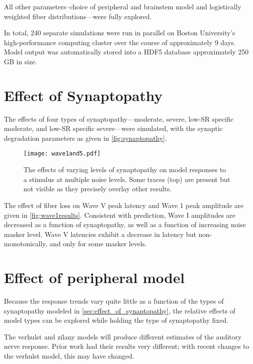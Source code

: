 All other parameters--choice of peripheral and brainstem model and logistically weighted fiber distributions---were fully explored.

In total, 240 separate simulations were run in parallel on Boston University's high-performance computing cluster over the course of approximately 9 days.  Model output was automatically stored into a HDF5 database approximately 250 GB in size.


\section{Effect of Synaptopathy} %
\label{sec:effect_of_synaptopathy}
The effects of four types of synaptopathy---moderate, severe, low-SR specific moderate, and low-SR specific severe---were simulated, with the synaptic degradation parameters as given in \autoref{fig:synaptopathy}. 

\begin{figure}[htbp]
	\centering
	\texttt{[image: wave1and5.pdf]}
	\caption[Effects of Synaptopathy]{The effects of varying levels of synaptopathy on model responses to a stimulus at multiple noise levels.  Some traces (top) are present but not visible as they precisely overlay other results.}
	\label{fig:wave1results}
\end{figure}

The effect of fiber loss on Wave V peak latency and Wave 1 peak amplitude are given in \autoref{fig:wave1results}.  Consistent with prediction, Wave I amplitudes are decreased as a function of synaptopathy, as well as a function of increasing noise masker level.  Wave V latencies exhibit a decrease in latency but non-monotonically, and only for some masker levels.

\section{Effect of peripheral model} %
\label{sec:effect_of_peripheral_model}
Because the response trends vary quite little as a function of the types of synaptopathy modeled in \autoref{sec:effect_of_synaptopathy}, the relative effects of model types can be explored while holding the type of synaptopathy fixed. 


The verhulst and zilany models will produce different estimates of the auditory nerve response. Prior work had their results very different; with recent changes to the verhulst model, this may have changed.


